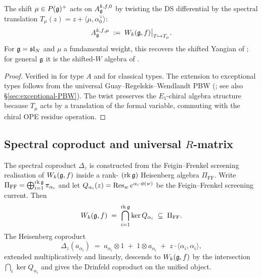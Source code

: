 \begin{proposition}
\label{prop:shift-twist}
\ClaimStatusProvedElsewhere
The shift $\mu\in P(\mathfrak{g})^{+}$ acts on
$A_{\mathfrak{g}}^{k,f,0}$ by twisting the DS differential by the spectral
translation $T_{\mu}(z) = z + \langle\mu, \alpha_0^{\vee}\rangle$:
\[
 A_{\mathfrak{g}}^{k,f,\mu} \;:=\; W_k(\mathfrak{g}, f)\big|_{T\mapsto T_{\mu}}.
\]
For $\mathfrak{g} = \mathfrak{sl}_N$ and $\mu$ a fundamental weight, this recovers the
shifted Yangian of \cite{KamnitzerTappeWeekes14}; for general $\mathfrak{g}$ it
is the shifted-$W$ algebra of \cite{TobaWeekes18}.
\end{proposition}

\begin{proof}
Verified in \cite[Theorem 4.5]{KamnitzerTappeWeekes14} for type $A$
and \cite[Proposition 3.7]{TobaWeekes18} for classical types. The
extension to exceptional types follows from the universal
Guay--Regelskis--Wendlandt PBW (\cite{GuayRegelskisWendlandt18};
see also \S\ref{sec:exceptional-PBW}). The twist preserves the
$E_1$-chiral algebra structure because $T_{\mu}$ acts by a
translation of the formal variable, commuting with the chiral OPE
residue operation.
\end{proof}

\subsection{Spectral coproduct and universal $R$-matrix}
\label{subsec:ucqg-coproduct}

The spectral coproduct $\Delta_z$ is constructed from the
Feigin--Frenkel screening realisation of $W_k(\mathfrak{g},f)$ inside a rank-
$(\mathrm{rk}\,\mathfrak{g})$ Heisenberg algebra $\Pi_{\mathrm{FF}}$. Write
$\Pi_{\mathrm{FF}} = \bigoplus_{i=1}^{\mathrm{rk}\,\mathfrak{g}}
\pi_{\alpha_i}$ and let $Q_{\alpha_i}(z) = \operatorname{Res}_w e^{\alpha_i\cdot
\phi(w)}$ be the Feigin--Frenkel screening current. Then
\begin{equation}
 \label{eq:FF-intersection}
 W_k(\mathfrak{g},f) \;=\; \bigcap_{i=1}^{\mathrm{rk}\,\mathfrak{g}}
 \ker Q_{\alpha_i}
 \;\subseteq\; \Pi_{\mathrm{FF}}.
\end{equation}
The Heisenberg coproduct
\[
 \Delta_z(a_{\alpha_i}) \;=\; a_{\alpha_i}\otimes 1 \;+\; 1\otimes a_{\alpha_i}
 \;+\; z\cdot \langle\alpha_i, \alpha_i\rangle,
\]
extended multiplicatively and linearly, descends to $W_k(\mathfrak{g},f)$ by
the intersection
$\bigcap_i \ker Q_{\alpha_i}$ and gives the Drinfeld coproduct on
the unified object.

